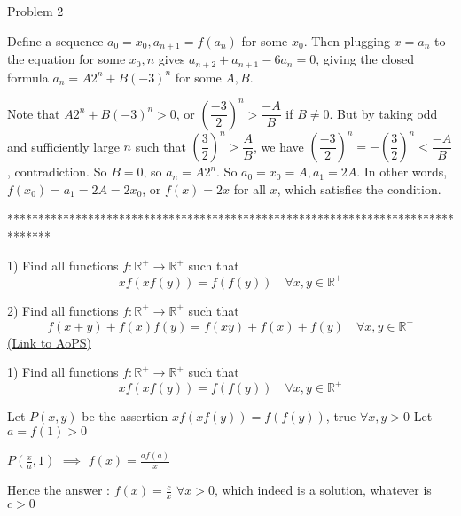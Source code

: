 \begin{solution}
	Problem 2

Define a sequence $a_0 = x_0, a_{n+1} = f(a_n)$ for some $x_0$. Then plugging $x = a_n$ to the equation for some $x_0, n$ gives $a_{n+2} + a_{n+1} - 6a_n = 0$, giving the closed formula $a_n = A2^n + B(-3)^n$ for some $A,B$.

Note that $A2^n + B(-3)^n > 0$, or $\left( \dfrac{-3}{2} \right)^n > \dfrac{-A}{B}$ if $B \neq 0$. But by taking odd and sufficiently large $n$ such that $\left( \dfrac{3}{2} \right)^n > \dfrac{A}{B}$, we have $\left( \dfrac{-3}{2} \right)^n = - \left( \dfrac{3}{2} \right)^n < \dfrac{-A}{B}$, contradiction. So $B = 0$, so $a_n = A2^n$. So $a_0 = x_0 = A, a_1 = 2A$. In other words, $f(x_0) = a_1 = 2A = 2x_0$, or $f(x) = 2x$ for all $x$, which satisfies the condition.
\end{solution}
*******************************************************************************
-------------------------------------------------------------------------------

\begin{problem}
	1) Find all functions $f:\mathbb{R}^+\to\mathbb{R}^+$  such that
\[xf(xf(y))=f(f(y)) \quad \forall x,y \in \mathbb{R}^+\]

2) Find all functions $f:\mathbb{R}^+\to\mathbb{R}^+$  such that
\[f(x+y)+f(x)f(y)=f(xy)+f(x)+f(y) \quad \forall x,y \in \mathbb{R}^+\]
	\flushright \href{https://artofproblemsolving.com/community/c6h563027}{(Link to AoPS)}
\end{problem}



\begin{solution}
	\begin{tcolorbox}1) Find all functions $f:\mathbb{R}^+\to\mathbb{R}^+$  such that
\[xf(xf(y))=f(f(y)) \quad \forall x,y \in \mathbb{R}^+\]\end{tcolorbox}
Let $P(x,y)$ be the assertion $xf(xf(y))=f(f(y))$, true $\forall x,y>0$
Let $a=f(1)>0$

$P(\frac xa,1)$ $\implies$ $f(x)=\frac {af(a)}x$

Hence the answer : $\boxed{f(x)=\frac cx}$ $\forall x>0$, which indeed is a solution, whatever is $c>0$
\end{solution}



